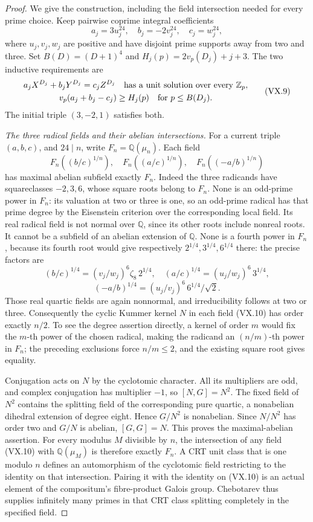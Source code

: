 \begin{proof}
We give the construction, including the field
intersection needed for every prime choice.
Keep pairwise coprime integral coefficients
\[
 a_j=3u_j^{24},\quad b_j=-2v_j^{24},\quad
 c_j=w_j^{24},
\]
where \(u_j,v_j,w_j\) are positive and have
disjoint prime supports away from two and three.
Set \(B(D)=(D+1)^4\) and
\(H_j(p)=2v_p(D_j)+j+3\). The two inductive
requirements are
\[
 \begin{gathered}
 a_jX^{D_j}+b_jY^{D_j}=c_jZ^{D_j}
 \quad\hbox{has a unit solution over every }\mathbb Z_p,\\
 v_p(a_j+b_j-c_j)\ge H_j(p)
 \quad\text{for }p\le B(D_j).
 \end{gathered}
 \tag{VX.9}
\]
The initial triple \((3,-2,1)\) satisfies both.

\emph{The three radical fields and their abelian intersections.}
For a current triple \((a,b,c)\), and \(24\mid n\),
write \(F_n=\mathbb Q(\mu_n)\). Each field
\[
 F_n((b/c)^{1/n}),\quad
 F_n((a/c)^{1/n}),\quad
 F_n((-a/b)^{1/n})
 \tag{VX.10}
\]
has maximal abelian subfield exactly \(F_n\).
Indeed the three radicands have squareclasses
\(-2,3,6\), whose square roots belong to \(F_n\).
None is an odd-prime power in \(F_n\): its valuation
at two or three is one, so an odd-prime radical has
that prime degree by the Eisenstein criterion over
the corresponding local field. Its real radical
field is not normal over \(\mathbb Q\), since its
other roots include nonreal roots. It cannot be a
subfield of an abelian extension of \(\mathbb Q\).
None is a fourth power in \(F_n\), because its
fourth root would give respectively
\(2^{1/4},3^{1/4},6^{1/4}\) there: the precise
factors are
\[
 (b/c)^{1/4}=(v_j/w_j)^6\zeta_8\,2^{1/4},
 \quad (a/c)^{1/4}=(u_j/w_j)^6\,3^{1/4},
\]
\[
 (-a/b)^{1/4}=(u_j/v_j)^6\,6^{1/4}/\sqrt2.
\]
Those real quartic fields are again nonnormal,
and irreducibility follows at two or three.
Consequently the cyclic Kummer kernel \(N\)
in each field (VX.10) has order exactly \(n/2\).
To see the degree assertion directly, a kernel
of order \(m\) would fix the \(m\)-th power
of the chosen radical, making the radicand an
\((n/m)\)-th power in \(F_n\); the preceding
exclusions force \(n/m\le2\), and the existing
square root gives equality.

Conjugation acts on \(N\) by the cyclotomic
character. All its multipliers are odd, and
complex conjugation has multiplier \(-1\), so
\([N,G]=N^2\). The fixed field of \(N^2\)
contains the splitting field of the corresponding
pure quartic, a nonabelian dihedral extension
of degree eight. Hence \(G/N^2\) is nonabelian.
Since \(N/N^2\) has order two and \(G/N\)
is abelian, \([G,G]=N\). This proves the
maximal-abelian assertion.
For every modulus \(M\) divisible by \(n\),
the intersection of any field (VX.10) with
\(\mathbb Q(\mu_M)\) is therefore exactly
\(F_n\). A CRT unit class that is one modulo
\(n\) defines an automorphism of the cyclotomic
field restricting to the identity on that
intersection. Pairing it with the identity on
(VX.10) is an actual element of the compositum's
fibre-product Galois group. Chebotarev
\cite[Theorem 8.31]{GhostMilneANT} thus supplies
infinitely many primes in that CRT class
splitting completely in the specified field.


\end{proof}

